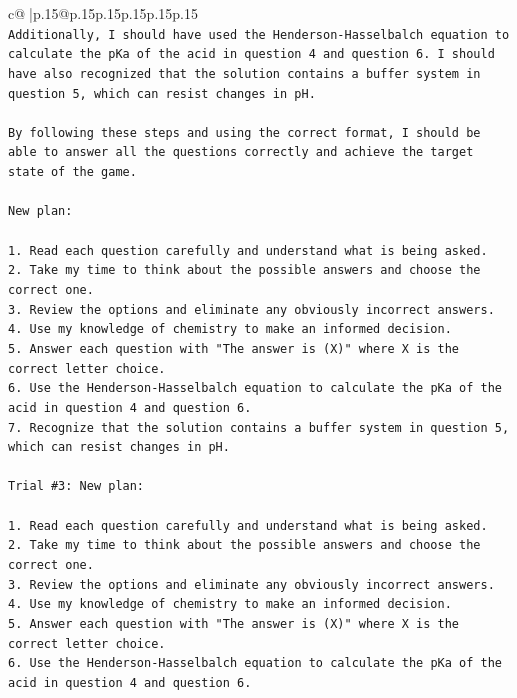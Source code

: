 \documentclass{article}
\begin{document}
{\begin{supertabular}{c@{$\;$}|p{.15\linewidth}@{}p{.15\linewidth}p{.15\linewidth}p{.15\linewidth}p{.15\linewidth}p{.15\linewidth}}
{{{\\ 
\texttt{Additionally, I should have used the Henderson{-}Hasselbalch equation to calculate the pKa of the acid in question 4 and question 6. I should have also recognized that the solution contains a buffer system in question 5, which can resist changes in pH.} \\
\\ 
\texttt{By following these steps and using the correct format, I should be able to answer all the questions correctly and achieve the target state of the game.} \\
\\ 
\texttt{New plan: } \\
\\ 
\texttt{1. Read each question carefully and understand what is being asked.} \\
\texttt{2. Take my time to think about the possible answers and choose the correct one.} \\
\texttt{3. Review the options and eliminate any obviously incorrect answers.} \\
\texttt{4. Use my knowledge of chemistry to make an informed decision.} \\
\texttt{5. Answer each question with "The answer is (X)" where X is the correct letter choice.} \\
\texttt{6. Use the Henderson{-}Hasselbalch equation to calculate the pKa of the acid in question 4 and question 6.} \\
\texttt{7. Recognize that the solution contains a buffer system in question 5, which can resist changes in pH.} \\
\\ 
\texttt{Trial \#3: New plan: } \\
\\ 
\texttt{1. Read each question carefully and understand what is being asked.} \\
\texttt{2. Take my time to think about the possible answers and choose the correct one.} \\
\texttt{3. Review the options and eliminate any obviously incorrect answers.} \\
\texttt{4. Use my knowledge of chemistry to make an informed decision.} \\
\texttt{5. Answer each question with "The answer is (X)" where X is the correct letter choice.} \\
\texttt{6. Use the Henderson{-}Hasselbalch equation to calculate the pKa of the acid in question 4 and question 6.} \\
}}}
\end{supertabular}}
\end{document}
